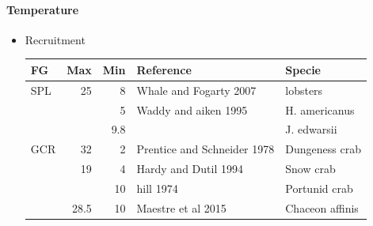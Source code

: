 \documentclass[11pt]{article}
\begin{document}
\paragraph*{Temperature}
\label{sec-5-2-1-13}
\begin{itemize}

\item Recruitment\\
\label{sec-5-2-1-13-1}%
\begin{center}
\begin{tabular}{lrrll}
 FG   &   Max  &  Min  &  Reference                    &  Specie           \\
\hline
 SPL  &    25  &    8  &  Whale and Fogarty 2007       &  lobsters         \\
      &        &    5  &  Waddy and aiken 1995         &  H. americanus    \\
      &        &  9.8  &                               &  J. edwarsii      \\
 GCR  &    32  &    2  &  Prentice and Schneider 1978  &  Dungeness crab   \\
      &    19  &    4  &  Hardy and Dutil 1994         &  Snow crab        \\
      &        &   10  &  hill 1974                    &  Portunid crab    \\
      &  28.5  &   10  &  Maestre et al 2015           &  Chaceon affinis  \\
\end{tabular}
\end{center}




\end{itemize}
\end{document}
